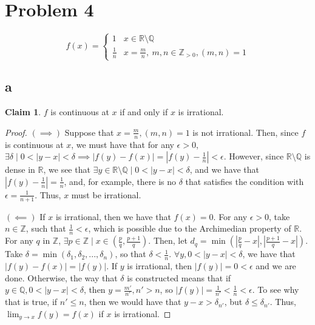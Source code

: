 \documentclass[12pt,letterpaper]{article}
\theoremstyle{definition}
\newtheorem*{claim}{Claim}
\newcommand{\R}{\mathbb{R}}
\newcommand{\Z}{\mathbb{Z}}
\newcommand{\Zg}{\mathbb{Z}_{>0}}
\newcommand{\Q}{\mathbb{Q}}
\begin{document}
\section*{Problem 4}

\[
  f(x) = \begin{cases}
    1 & x \in \R \setminus \Q \\
    \frac{1}{n} & x = \frac{m}{n}, \ m, n \in \Zg, (m,n) = 1 
  \end{cases}
\]

\subsection*{a}

\begin{claim}
  $f$ is continuous at $x$ if and only if $x$ is irrational.
\end{claim}

\begin{proof}
  $(\implies)$ Suppose that $x = \frac{m}{n}, (m,n) = 1$ is not irrational. Then, since $f$ is continuous
  at $x$, we must have that for any $\epsilon > 0$, $\exists \delta \mid 0 < |y
  - x| < \delta \implies |f(y) - f(x)| = |f(y) - \frac{1}{n}| < \epsilon$.
  However, since $\R \setminus \Q$
  is dense in $\R$, we see that $\exists y \in \R \setminus \Q \mid 0 < |y-x| <
  \delta$, and we have that $|f(y) - \frac{1}{n}| = \frac{1}{n}$, and, for example, there is
  no $\delta$ that satisfies the condition with $\epsilon = \frac{1}{n+1}$.
  Thus, $x$ must be irrational.

  $(\impliedby)$ If $x$ is irrational, then we have that $f(x) = 0$. For any
  $\epsilon > 0$, take $n \in \Z$, such that $\frac{1}{n} < \epsilon$, which is
  possible due to the Archimedian property of $\R$.
  For any $q$ in $\Z$,  $ \exists p\in \Z \mid x \in (\frac{p}{q}, \frac{p+1}{q})$.
  Then, let $d_q = \min(|\frac{p}{q} - x|, |\frac{p+1}{q} -x|)$. Take $\delta =
  \min(\delta_1,\delta_2,...,\delta_n)$, so that $\delta < \frac{1}{n}$.
  $\forall y, 0 < |y - x| < \delta$, we have that $|f(y) - f(x)| = |f(y)|$. If
  $y$ is irrational, then $|f(y)| = 0 < \epsilon$ and we are done. Otherwise,
  the way that  $\delta$ is constructed
  means that if $y \in \Q, 0 < |y-x| < \delta$, then $y = \frac{m'}{n'}, n' > n$, so $|f(y)| =
  \frac{1}{n'} < \frac{1}{n} < \epsilon$. To see why that is true, if $n' \leq
  n$, then we would have that $y - x > \delta_{n'}$, but $\delta \leq
  \delta_{n'}$.  Thus, $\lim_{y\rightarrow x}f(y) = f(x)$ if $x$ is irrational.
\end{proof}
\end{document}
